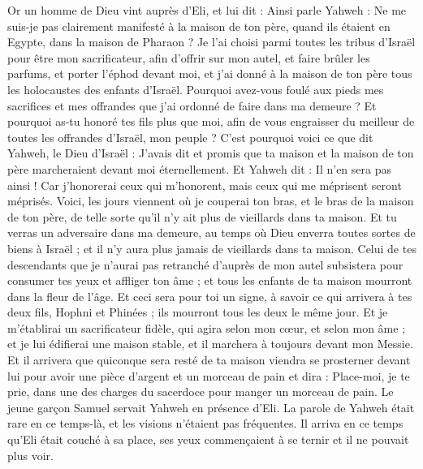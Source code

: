 \begin{multicols}{2}
Or un homme de Dieu vint auprès d'Eli, et lui dit : Ainsi parle Yahweh : Ne me suis-je pas clairement manifesté à la maison de ton père, quand ils étaient en Egypte, dans la maison de Pharaon ?
Je l'ai choisi parmi toutes les tribus d'Israël pour être mon sacrificateur, afin d'offrir sur mon autel, et faire brûler les parfums, et porter l'éphod devant moi, et j'ai donné à la maison de ton père tous les holocaustes des enfants d'Israël.
Pourquoi avez-vous foulé aux pieds mes sacrifices et mes offrandes que j'ai ordonné de faire dans ma demeure ? Et pourquoi as-tu honoré tes fils plus que moi, afin de vous engraisser du meilleur de toutes les offrandes d'Israël, mon peuple ?
C'est pourquoi voici ce que dit Yahweh, le Dieu d'Israël : J'avais dit et promis que ta maison et la maison de ton père marcheraient devant moi éternellement. Et Yahweh dit : Il n'en sera pas ainsi ! Car j'honorerai ceux qui m'honorent, mais ceux qui me méprisent seront méprisés.
Voici, les jours viennent où je couperai ton bras, et le bras de la maison de ton père, de telle sorte qu'il n'y ait plus de vieillards dans ta maison.
Et tu verras un adversaire dans ma demeure, au temps où Dieu enverra toutes sortes de biens à Israël ; et il n'y aura plus jamais de vieillards dans ta maison.
Celui de tes descendants que je n'aurai pas retranché d'auprès de mon autel subsistera pour consumer tes yeux et affliger ton âme ; et tous les enfants de ta maison mourront dans la fleur de l'âge.
Et ceci sera pour toi un signe, à savoir ce qui arrivera à tes deux fils, Hophni et Phinées ; ils mourront tous les deux le même jour.
Et je m'établirai un sacrificateur fidèle, qui agira selon mon cœur, et selon mon âme ; et je lui édifierai une maison stable, et il marchera à toujours devant mon Messie.
Et il arrivera que quiconque sera resté de ta maison viendra se prosterner devant lui pour avoir une pièce d'argent et un morceau de pain et dira : Place-moi, je te prie, dans une des charges du sacerdoce pour manger un morceau de pain.
\VerseOne{}Le jeune garçon Samuel servait Yahweh en présence d'Eli. La parole de Yahweh était rare en ce temps-là, et les visions n'étaient pas fréquentes.
Il arriva en ce temps qu'Eli était couché à sa place, ses yeux commençaient à se ternir et il ne pouvait plus voir.

\end{multicols}
